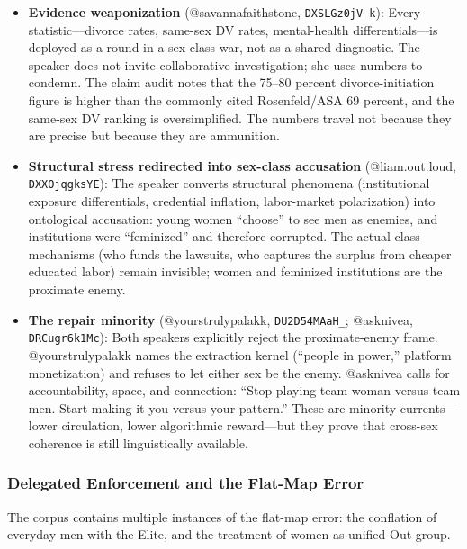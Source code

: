 \documentclass[12pt]{article}
\begin{document}
\begin{itemize}
  \item \textbf{Evidence weaponization} (@savannafaithstone, \texttt{DXSLGz0jV-k}): Every statistic---divorce rates, same-sex DV rates, mental-health differentials---is deployed as a round in a sex-class war, not as a shared diagnostic. The speaker does not invite collaborative investigation; she uses numbers to condemn. The claim audit notes that the 75--80 percent divorce-initiation figure is higher than the commonly cited Rosenfeld/ASA 69 percent, and the same-sex DV ranking is oversimplified. The numbers travel not because they are precise but because they are ammunition.
  
  \item \textbf{Structural stress redirected into sex-class accusation} (@liam.out.loud, \texttt{DXXOjqgksYE}): The speaker converts structural phenomena (institutional exposure differentials, credential inflation, labor-market polarization) into ontological accusation: young women ``choose'' to see men as enemies, and institutions were ``feminized'' and therefore corrupted. The actual class mechanisms (who funds the lawsuits, who captures the surplus from cheaper educated labor) remain invisible; women and feminized institutions are the proximate enemy.
  
  \item \textbf{The repair minority} (@yourstrulypalakk, \texttt{DU2D54MAaH\_}; @asknivea, \texttt{DRCugr6k1Mc}): Both speakers explicitly reject the proximate-enemy frame. @yourstrulypalakk names the extraction kernel (``people in power,'' platform monetization) and refuses to let either sex be the enemy. @asknivea calls for accountability, space, and connection: ``Stop playing team woman versus team men. Start making it you versus your pattern.'' These are minority currents---lower circulation, lower algorithmic reward---but they prove that cross-sex coherence is still linguistically available.
\end{itemize}

\subsubsection{Delegated Enforcement and the Flat-Map Error}

The corpus contains multiple instances of the flat-map error: the conflation of everyday men with the Elite, and the treatment of women as unified Out-group.
\end{document}
